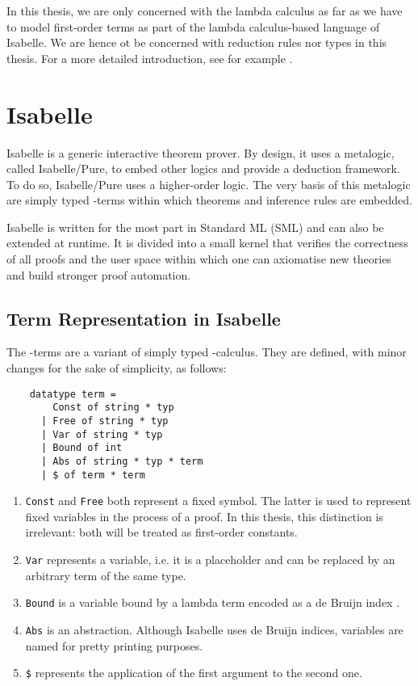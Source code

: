 In this thesis, we are only concerned with the lambda calculus as far as we have to model first-order terms as part of the lambda calculus-based language of Isabelle. We are hence ot be concerned with reduction rules nor types in this thesis. For a more detailed introduction, see for example \cite{loader_notes_1998}.

\section{Isabelle}
Isabelle is a generic interactive theorem prover. By design, it uses a metalogic, called Isabelle/Pure, to embed other logics and provide a deduction framework. To do so, Isabelle/Pure uses a higher-order logic. The very basis of this metalogic are simply typed \lam -terms within which theorems and inference rules are embedded. \cite{wenzel_isabelleisar_2021}

Isabelle is written for the most part in Standard ML (SML) and can also be extended at runtime. It is divided into a small kernel that verifies the correctness of all proofs and the user space within which one can axiomatise new theories and build stronger proof automation.

\subsection{Term Representation in Isabelle}
The \lam -terms are a variant of simply typed \lam -calculus. They are defined, with minor changes for the sake of simplicity, as follows:
\begin{lstlisting}
    datatype term =
        Const of string * typ
      | Free of string * typ
      | Var of string * typ
      | Bound of int
      | Abs of string * typ * term
      | $ of term * term
\end{lstlisting} %
\vspace{-12pt}
\begin{enumerate}
  \item \lstinline{Const} and \lstinline{Free} both represent a fixed symbol. The latter is used to represent fixed variables in the process of a proof. In this thesis, this distinction is irrelevant: both will be treated as first-order constants.
  \item \lstinline{Var} represents a variable, i.e. it is a placeholder and can be replaced by an arbitrary term of the same type.
  \item \lstinline{Bound} is a variable bound by a lambda term encoded as a de Bruijn index \cite{de_bruijn_lambda_1972}.
  \item \lstinline{Abs} is an abstraction. Although Isabelle uses de Bruijn indices, variables are named for pretty printing purposes.
  \item \lstinline{$} represents the application of the first argument to the second one.
\end{enumerate} %


